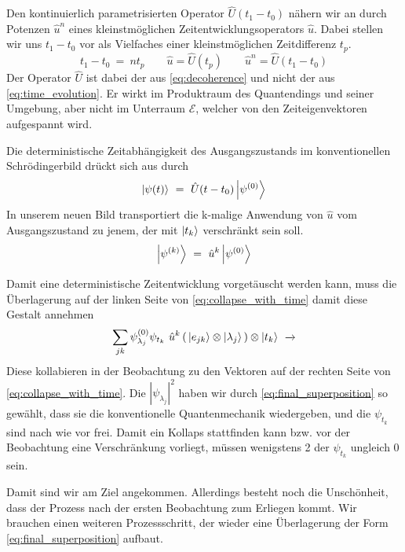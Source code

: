 \documentclass[12pt]{article}
\begin{document}
Den kontinuierlich parametrisierten Operator $\hat{U}(t_1-t_0)$ nähern wir an durch Potenzen $\hat{u}^n$ eines kleinstmöglichen Zeitentwicklungsoperators $\hat{u}$. Dabei stellen wir uns $t_1-t_0$ vor als Vielfaches einer kleinstmöglichen Zeitdifferenz $t_p$.
\begin{equation*}
t_1-t_0\ =\ n t_p \quad\quad 
\hat{u} = \hat{U}(t_p) \quad\quad 
\hat{u}^n = \hat{U}(t_1-t_0)
\end{equation*}
Der Operator $\hat{U}$ ist dabei der aus \eqref{eq:decoherence} und nicht der aus \eqref{eq:time_evolution}. Er wirkt im Produktraum des Quantendings und seiner Umgebung, aber nicht im Unterraum $\mathscr{E}$, welcher von den Zeiteigenvektoren aufgespannt wird.

Die deterministische Zeitabhängigkeit des Ausgangszustands im konventionellen Schrödingerbild drückt sich aus durch
\begin{equation*}
\ket{\psi(t)}\ =\ \hat{U}(t-t_0)\ket{\psi^{(0)}}
\end{equation*} 
In unserem neuen Bild transportiert die k-malige Anwendung von $\hat{u}$ vom Ausgangszustand zu jenem, der mit $\ket{t_k}$ verschränkt sein soll.
\begin{equation*}
\ket{\psi^{(k)}}\ =\ \hat{u}^k \ket{\psi^{(0)}}
\end{equation*} 

Damit eine deterministische Zeitentwicklung vorgetäuscht werden kann, muss die Überlagerung auf der linken Seite von \eqref{eq:collapse_with_time} damit diese Gestalt annehmen
\begin{equation}
\label{eq:final_superposition}
\sum_{jk} \psi_{\lambda_j}^{(0)}\psi_{t_k}\ \hat{u}^{k} \left(\,\ket{e_{jk}} \otimes \ket{\lambda_j} \,\right) \otimes \ket{t_k}
\ \xrightarrow{}
\end{equation}
Diese kollabieren in der Beobachtung zu den Vektoren auf der rechten Seite von  \eqref{eq:collapse_with_time}. Die $|\psi_{\lambda_j}|^2$ haben wir durch \eqref{eq:final_superposition} so gewählt, dass sie die konventionelle Quantenmechanik wiedergeben, und die $\psi_{t_k}$ sind nach wie vor frei. Damit ein Kollaps stattfinden kann bzw. vor der Beobachtung eine Verschränkung vorliegt, müssen wenigstens 2 der $\psi_{t_k}$ ungleich 0 sein. 

Damit sind wir am Ziel angekommen. Allerdings besteht noch die Unschönheit, dass der Prozess nach der ersten Beobachtung zum Erliegen kommt. Wir brauchen einen weiteren Prozessschritt, der wieder eine Überlagerung der Form \eqref{eq:final_superposition} aufbaut. 
\end{document}

